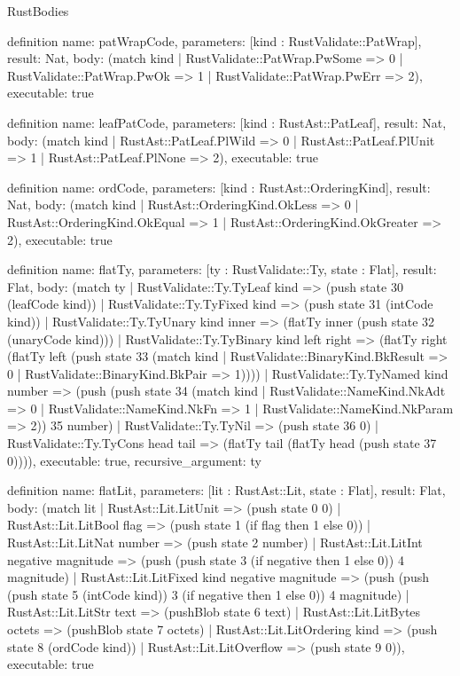 \begin{lexlean}{RustBodies}
\begin{semanticmodule}
definition{
  name: patWrapCode,
  parameters: [kind : RustValidate::PatWrap],
  result: Nat,
  body: (match kind
    | RustValidate::PatWrap.PwSome => 0
    | RustValidate::PatWrap.PwOk => 1
    | RustValidate::PatWrap.PwErr => 2),
  executable: true
}

definition{
  name: leafPatCode,
  parameters: [kind : RustAst::PatLeaf],
  result: Nat,
  body: (match kind
    | RustAst::PatLeaf.PlWild => 0
    | RustAst::PatLeaf.PlUnit => 1
    | RustAst::PatLeaf.PlNone => 2),
  executable: true
}

definition{
  name: ordCode,
  parameters: [kind : RustAst::OrderingKind],
  result: Nat,
  body: (match kind
    | RustAst::OrderingKind.OkLess => 0
    | RustAst::OrderingKind.OkEqual => 1
    | RustAst::OrderingKind.OkGreater => 2),
  executable: true
}

definition{
  name: flatTy,
  parameters: [ty : RustValidate::Ty, state : Flat],
  result: Flat,
  body: (match ty
    | RustValidate::Ty.TyLeaf kind => (push state 30 (leafCode kind))
    | RustValidate::Ty.TyFixed kind => (push state 31 (intCode kind))
    | RustValidate::Ty.TyUnary kind inner => (flatTy inner (push state 32 (unaryCode kind)))
    | RustValidate::Ty.TyBinary kind left right => (flatTy right (flatTy left (push state 33 (match kind
      | RustValidate::BinaryKind.BkResult => 0
      | RustValidate::BinaryKind.BkPair => 1))))
    | RustValidate::Ty.TyNamed kind number => (push (push state 34 (match kind
      | RustValidate::NameKind.NkAdt => 0
      | RustValidate::NameKind.NkFn => 1
      | RustValidate::NameKind.NkParam => 2)) 35 number)
    | RustValidate::Ty.TyNil => (push state 36 0)
    | RustValidate::Ty.TyCons head tail => (flatTy tail (flatTy head (push state 37 0)))),
  executable: true,
  recursive_argument: ty
}

definition{
  name: flatLit,
  parameters: [lit : RustAst::Lit, state : Flat],
  result: Flat,
  body: (match lit
    | RustAst::Lit.LitUnit => (push state 0 0)
    | RustAst::Lit.LitBool flag => (push state 1 (if flag then 1 else 0))
    | RustAst::Lit.LitNat number => (push state 2 number)
    | RustAst::Lit.LitInt negative magnitude => (push (push state 3 (if negative then 1 else 0)) 4 magnitude)
    | RustAst::Lit.LitFixed kind negative magnitude => (push (push (push state 5 (intCode kind)) 3 (if negative then 1 else 0)) 4 magnitude)
    | RustAst::Lit.LitStr text => (pushBlob state 6 text)
    | RustAst::Lit.LitBytes octets => (pushBlob state 7 octets)
    | RustAst::Lit.LitOrdering kind => (push state 8 (ordCode kind))
    | RustAst::Lit.LitOverflow => (push state 9 0)),
  executable: true
}


\end{semanticmodule}
\end{lexlean}
